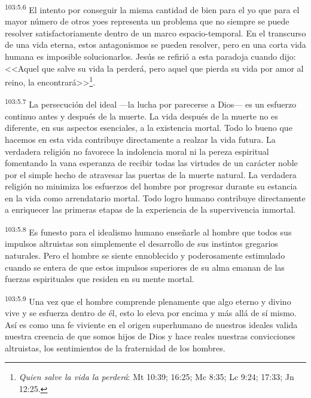 \documentclass[twoside, 11pt]{book}
\begin{document}
\par
\textsuperscript{103:5.6} El intento por conseguir la misma cantidad de bien para el yo que para el mayor número de otros yoes representa un problema que no siempre se puede resolver satisfactoriamente dentro de un marco espacio-temporal. En el transcurso de una vida eterna, estos antagonismos se pueden resolver, pero en una corta vida humana es imposible solucionarlos. Jesús se refirió a esta paradoja cuando dijo: <<Aquel que salve su vida la perderá, pero aquel que pierda su vida por amor al reino, la encontrará>>\footnote{\textit{Quien salve la vida la perderá}: Mt 10:39; 16:25; Mc 8:35; Lc 9:24; 17:33; Jn 12:25.}.

\par
\textsuperscript{103:5.7} La persecución del ideal ---la lucha por parecerse a Dios--- es un esfuerzo continuo antes y después de la muerte. La vida después de la muerte no es diferente, en sus aspectos esenciales, a la existencia mortal. Todo lo bueno que hacemos en esta vida contribuye directamente a realzar la vida futura. La verdadera religión no favorece la indolencia moral ni la pereza espiritual fomentando la vana esperanza de recibir todas las virtudes de un carácter noble por el simple hecho de atravesar las puertas de la muerte natural. La verdadera religión no minimiza los esfuerzos del hombre por progresar durante su estancia en la vida como arrendatario mortal. Todo logro humano contribuye directamente a enriquecer las primeras etapas de la experiencia de la supervivencia inmortal.

\par
\textsuperscript{103:5.8} Es funesto para el idealismo humano enseñarle al hombre que todos sus impulsos altruistas son simplemente el desarrollo de sus instintos gregarios naturales. Pero el hombre se siente ennoblecido y poderosamente estimulado cuando se entera de que estos impulsos superiores de su alma emanan de las fuerzas espirituales que residen en su mente mortal.

\par
\textsuperscript{103:5.9} Una vez que el hombre comprende plenamente que algo eterno y divino vive y se esfuerza dentro de él, esto lo eleva por encima y más allá de sí mismo. Así es como una fe viviente en el origen superhumano de nuestros ideales valida nuestra creencia de que somos hijos de Dios y hace reales nuestras convicciones altruistas, los sentimientos de la fraternidad de los hombres.
\end{document}

